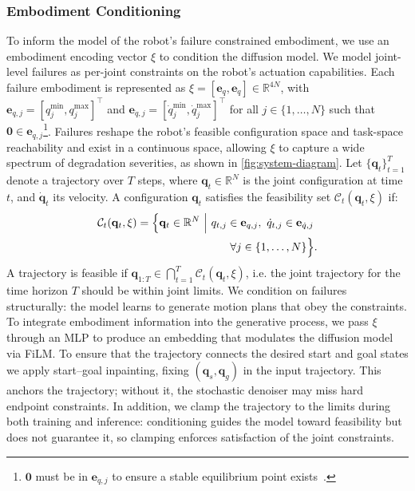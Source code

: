 \subsubsection{Embodiment Conditioning}
To inform the model of the robot's failure constrained embodiment, we use an embodiment encoding vector $\xi$ to condition the diffusion model. We model joint-level failures as per-joint constraints on the robot's actuation capabilities. Each failure embodiment is represented as $\xi = [\mathbf{e}_q, \mathbf{e}_{\dot{q}}] \in \mathbb{R}^{4N}$, with $\mathbf{e}_{q,j} = [q_j^{\min}, q_j^{\max}]^\top$ and $\mathbf{e}_{\dot{q},j} = [\dot{q}_j^{\min}, \dot{q}_j^{\max}]^\top$ for all $j \in \{1,\dots,N\}$ such that $\mathbf{0} \in \mathbf{e}_{\dot{q},j}$\footnote{$\mathbf{0}$ must be in $\mathbf{e}_{\dot{q},j}$ to ensure a stable equilibrium point exists~\cite{blanchard_differential_2011}.}.  
 Failures reshape the robot’s feasible configuration space and task-space reachability and exist in a continuous space, allowing $\xi$ to capture a wide spectrum of degradation severities, as shown in \cref{fig:system-diagram}. Let $\{\mathbf{q}_t\}_{t=1}^T$ denote a trajectory over $T$ steps, where $\mathbf{q}_t \in \mathbb{R}^N$ is the joint configuration at time $t$, and $\dot{\mathbf{q}}_t$ its velocity. A configuration $\mathbf{q}_t$ satisfies the feasibility set $\mathcal{C}_t(\mathbf{q}_t,\xi)$ if:%
{\setlength{\abovedisplayskip}{6pt}\setlength{\belowdisplayskip}{6pt}\setlength{\abovedisplayshortskip}{4pt}\setlength{\belowdisplayshortskip}{4pt}%
\begin{equation}
\begin{aligned}
\small
  \mathcal{C}_t(\mathbf{q}_t,\xi)=\Big\{\mathbf{q}_t\in\mathbb{R}^N\ \Big|\ 
  q_{t,j}\in \mathbf{e}_{q,j},\ \dot{q}_{t,j}\in \mathbf{e}_{\dot{q},j}\ \\ \ \forall j\in\{1,\dots,N\}\Big\}.
\end{aligned}
\end{equation}}%
A trajectory is feasible if $\mathbf{q}_{1:T}\in\bigcap_{t=1}^T \mathcal{C}_t(\mathbf{q}_t,\xi)$, i.e. the joint trajectory for the time horizon $T$ should be within joint limits. We condition on failures structurally: the model learns to generate motion plans that obey the constraints.%
To integrate embodiment information into the generative process, we pass $\xi$ through an MLP to produce an embedding that modulates the diffusion model via FiLM. To ensure that the trajectory connects the desired start and goal states we apply start–goal inpainting, fixing $(\mathbf{q}_s,\mathbf{q}_g)$ in the input trajectory. This anchors the trajectory; without it, the stochastic denoiser may miss hard endpoint constraints. In addition, we clamp the trajectory to the limits during both training and inference: conditioning guides the model toward feasibility but does not guarantee it, so clamping enforces satisfaction of the joint constraints.


